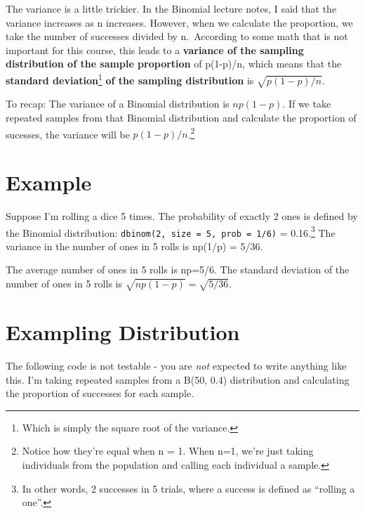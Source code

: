 \documentclass[
  letterpaper,
  DIV=11,
  numbers=noendperiod]{scrreprt}
\begin{document}
The variance is a little trickier. In the Binomial lecture notes, I said
that the variance increases as n increases. However, when we calculate
the proportion, we take the number of successes divided by n.~According
to some math that is not important for this course, this leads to a
\textbf{variance of the sampling distribution of the sample proportion}
of p(1-p)/n, which means that the \textbf{standard deviation}\footnote{Which
  is simply the square root of the variance.} \textbf{of the sampling
distribution} is \(\sqrt{p(1-p)/n}\).

To recap: The variance of a Binomial distribution is \(np(1-p)\). If we
take repeated samples from that Binomial distribution and calculate the
proportion of sucesses, the variance will be \(p(1-p)/n\).\footnote{Notice
  how they're equal when n = 1. When n=1, we're just taking individuals
  from the population and calling each individual a sample.}

\hypertarget{example-2}{%
\section{Example}\label{example-2}}

Suppose I'm rolling a dice 5 times. The probability of exactly 2 ones is
defined by the Binomial distribution:
\texttt{dbinom(2,\ size\ =\ 5,\ prob\ =\ 1/6)} = 0.16.\footnote{In other
  words, 2 successes in 5 trials, where a success is defined as
  ``rolling a one''.} The variance in the number of ones in 5 rolls is
np(1/p) = 5/36.

The average number of ones in 5 rolls is np=5/6. The standard deviation
of the number of ones in 5 rolls is \(\sqrt{np(1-p)} = \sqrt{5/36}\).

\hypertarget{exampling-distribution}{%
\section{Exampling Distribution}\label{exampling-distribution}}

The following code is not testable - you are \emph{not} expected to
write anything like this. I'm taking repeated samples from a B(50, 0.4)
distribution and calculating the proportion of successes for each
sample.
\end{document}
